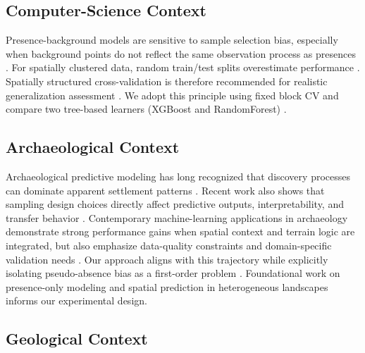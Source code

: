 \documentclass{article}
\begin{document}
\subsection{Computer-Science Context}

Presence-background models are sensitive to sample selection bias, especially when background points do not reflect the same observation process as presences \cite{phillips2009,elith2006,araujo2006}.
For spatially clustered data, random train/test splits overestimate performance \cite{kohavi1995}.
Spatially structured cross-validation is therefore recommended for realistic generalization assessment \cite{roberts2017,valavi2019}.
We adopt this principle using fixed block CV and compare two tree-based learners (XGBoost and RandomForest) \cite{chen2016,breiman2001}.

\subsection{Archaeological Context}

Archaeological predictive modeling has long recognized that discovery processes can dominate apparent settlement patterns \cite{verhagen2012,kamermans2019,verhagen2020}.
Recent work also shows that sampling design choices directly affect predictive outputs, interpretability, and transfer behavior \cite{comer2023}.
Contemporary machine-learning applications in archaeology demonstrate strong performance gains when spatial context and terrain logic are integrated, but also emphasize data-quality constraints and domain-specific validation needs \cite{castiello2021,wang2023}.
Our approach aligns with this trajectory while explicitly isolating pseudo-absence bias as a first-order problem \cite{barbet2012,senay2013,wisz2009,lobo2010}. Foundational work on presence-only modeling \cite{phillips2006,kvamme2006} and spatial prediction in heterogeneous landscapes \cite{nuninger2016,araujo2005} informs our experimental design.

\subsection{Geological Context}
\end{document}
